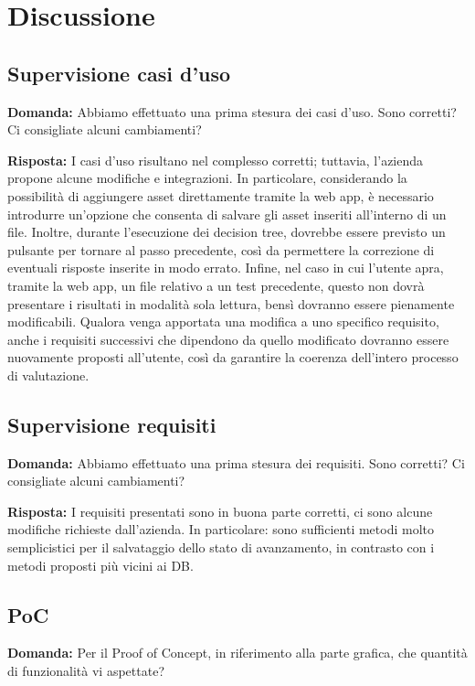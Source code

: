 \documentclass[a4paper,12pt]{article}
\begin{document}
\section{Discussione}{

    \subsection{Supervisione casi d'uso}
    \textbf{Domanda:} Abbiamo effettuato una prima stesura dei casi d'uso. Sono corretti? Ci consigliate alcuni cambiamenti?
    
    \textbf{Risposta:} I casi d'uso risultano nel complesso corretti; tuttavia, l'azienda propone alcune modifiche e integrazioni.
    In particolare, considerando la possibilità di aggiungere asset direttamente tramite la web app, è necessario introdurre un'opzione che consenta di salvare gli asset inseriti all'interno di un file.\newline
    Inoltre, durante l'esecuzione dei decision tree, dovrebbe essere previsto un pulsante per tornare al passo precedente, così da permettere la correzione di eventuali risposte inserite in modo errato.\newline
    Infine, nel caso in cui l'utente apra, tramite la web app, un file relativo a un test precedente, questo non dovrà presentare i risultati in modalità sola lettura, bensì dovranno essere pienamente modificabili.
    Qualora venga apportata una modifica a uno specifico requisito, anche i requisiti successivi che dipendono da quello modificato dovranno essere nuovamente proposti all'utente, così da garantire la coerenza dell'intero processo di valutazione.

    \subsection{Supervisione requisiti}
    \textbf{Domanda:} Abbiamo effettuato una prima stesura dei requisiti. Sono corretti? Ci consigliate alcuni cambiamenti?

    \textbf{Risposta:}  I requisiti presentati sono in buona parte corretti, ci sono alcune modifiche richieste dall'azienda. In particolare: sono sufficienti metodi molto semplicistici per il salvataggio dello stato di avanzamento, in contrasto con i metodi proposti più vicini ai DB.
    \subsection{PoC}
    \textbf{Domanda:} Per il Proof of Concept, in riferimento alla parte grafica, che quantità di funzionalità vi aspettate?
    
}
\end{document}
